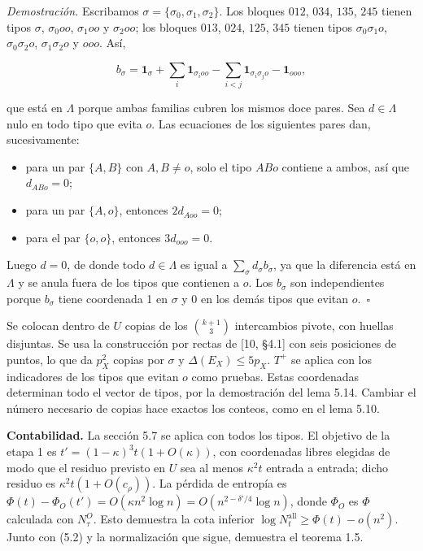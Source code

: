 \documentclass[spanish,11pt,a4paper]{article}
\providecommand{\tightlist}{\setlength{\itemsep}{0pt}\setlength{\parskip}{0pt}}
\begin{document}
\emph{Demostración.} Escribamos \(\sigma=\{\sigma_0,\sigma_1,\sigma_2\}\). Los bloques \(012\), \(034\), \(135\), \(245\) tienen tipos \(\sigma\), \(\sigma_0oo\), \(\sigma_1oo\) y \(\sigma_2oo\); los bloques \(013\), \(024\), \(125\), \(345\) tienen tipos \(\sigma_0\sigma_1o\), \(\sigma_0\sigma_2o\), \(\sigma_1\sigma_2o\) y \(ooo\). Así,

\nopagebreak[4]
\[b_\sigma=\mathbf 1_\sigma+\sum_i\mathbf 1_{\sigma_ioo}-\sum_{i<j}\mathbf 1_{\sigma_i\sigma_jo}-\mathbf 1_{ooo},\]

que está en \(\Lambda\) porque ambas familias cubren los mismos doce pares. Sea \(d\in\Lambda\) nulo en todo tipo que evita \(o\). Las ecuaciones de los siguientes pares dan, sucesivamente:

\begin{itemize}
\tightlist
\item
  para un par \(\{A,B\}\) con \(A,B\ne o\), solo el tipo \(ABo\) contiene a ambos, así que \(d_{ABo}=0\);
\item
  para un par \(\{A,o\}\), entonces \(2d_{Aoo}=0\);
\item
  para el par \(\{o,o\}\), entonces \(3d_{ooo}=0\).
\end{itemize}

Luego \(d=0\), de donde todo \(d\in\Lambda\) es igual a \(\sum_\sigma d_\sigma b_\sigma\), ya que la diferencia está en \(\Lambda\) y se anula fuera de los tipos que contienen a \(o\). Los \(b_\sigma\) son independientes porque \(b_\sigma\) tiene coordenada 1 en \(\sigma\) y 0 en los demás tipos que evitan \(o\).~\(\square\)

Se colocan dentro de \(U\) copias de los \(\binom{k+1}{3}\) intercambios pivote, con huellas disjuntas. Se usa la construcción por rectas de {[}10, §4.1{]} con seis posiciones de puntos, lo que da \(p_X^2\) copias por \(\sigma\) y \(\Delta(E_X)\le5p_X\). \(T^+\) se aplica con los indicadores de los tipos que evitan \(o\) como pruebas. Estas coordenadas determinan todo el vector de tipos, por la demostración del lema 5.14. Cambiar el número necesario de copias hace exactos los conteos, como en el lema 5.10.

\textbf{Contabilidad.} La sección 5.7 se aplica con todos los tipos. El objetivo de la etapa 1 es \(t'=(1-\kappa)^3t(1+O(\kappa))\), con coordenadas libres elegidas de modo que el residuo previsto en \(U\) sea al menos \(\kappa^2t\) entrada a entrada; dicho residuo es \(\kappa^2t(1+O(c_\rho))\). La pérdida de entropía es \(\Phi(t)-\Phi_O(t')=O(\kappa n^2\log n)=O(n^{2-\delta'/4}\log n)\), donde \(\Phi_O\) es \(\Phi\) calculada con \(N^O_\tau\). Esto demuestra la cota inferior \(\log N^{\mathrm{all}}_t\ge\Phi(t)-o(n^2)\). Junto con (5.2) y la normalización que sigue, demuestra el teorema 1.5.
\end{document}
